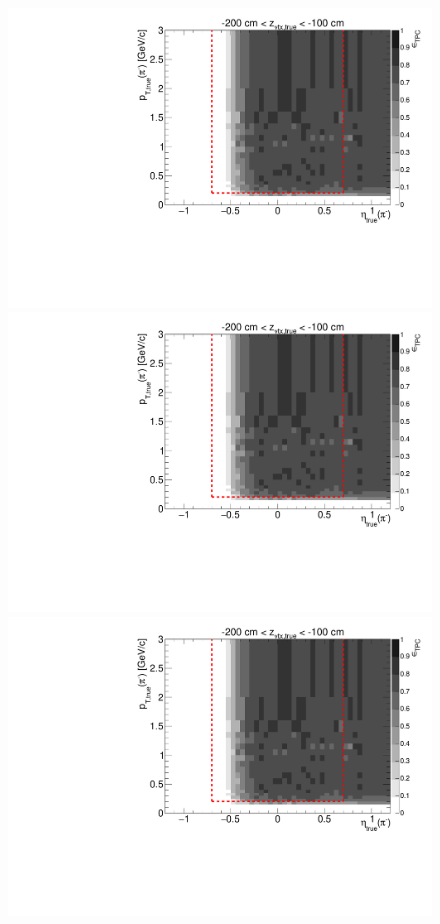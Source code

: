 \begin{figure}[hb]\ContinuedFloat
\centering
\parbox{0.495\textwidth}{
  \centering
  \includegraphics[width=\linewidth,page=11]{graphics/eff/Eff2D_TPC_pion_Minus.pdf}\\
  \includegraphics[width=\linewidth,page=13]{graphics/eff/Eff2D_TPC_pion_Minus.pdf}\\
  \includegraphics[width=\linewidth,page=15]{graphics/eff/Eff2D_TPC_pion_Minus.pdf}\\
}
\end{figure}
